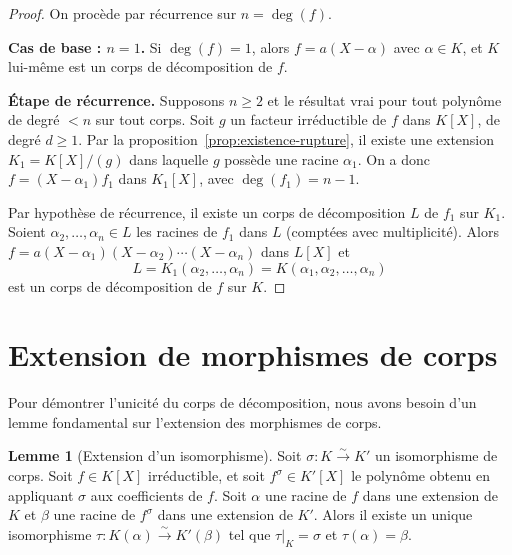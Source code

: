 \documentclass[12pt,a4paper,openany]{book}
\theoremstyle{definition}
\newtheorem{lemme}{Lemme}[chapter]
\renewcommand{\deg}{\operatorname{deg}}
\begin{document}
\begin{proof}
On procède par récurrence sur $n = \deg(f)$.

\textbf{Cas de base : $n = 1$.} Si $\deg(f) = 1$, alors $f = a(X - \alpha)$
avec $\alpha \in K$, et $K$ lui-même est un corps de décomposition de $f$.

\textbf{Étape de récurrence.} Supposons $n \geq 2$ et le résultat vrai pour
tout polynôme de degré $< n$ sur tout corps. Soit $g$ un facteur irréductible
de $f$ dans $K[X]$, de degré $d \geq 1$. Par la proposition~\ref{prop:existence-rupture},
il existe une extension $K_1 = K[X]/(g)$ dans laquelle $g$ possède une racine
$\alpha_1$. On a donc $f = (X - \alpha_1) f_1$ dans $K_1[X]$, avec
$\deg(f_1) = n - 1$.

Par hypothèse de récurrence, il existe un corps de décomposition $L$ de $f_1$
sur $K_1$. Soient $\alpha_2, \dots, \alpha_n \in L$ les racines de $f_1$ dans $L$
(comptées avec multiplicité). Alors
$f = a(X - \alpha_1)(X - \alpha_2)\cdots(X - \alpha_n)$ dans $L[X]$ et
\[
  L = K_1(\alpha_2, \dots, \alpha_n) = K(\alpha_1, \alpha_2, \dots, \alpha_n)
\]
est un corps de décomposition de $f$ sur $K$.
\end{proof}

\section{Extension de morphismes de corps}
\label{sec:extension-morphismes}

Pour démontrer l'unicité du corps de décomposition, nous avons besoin d'un lemme
fondamental sur l'extension des morphismes de corps.

\begin{lemme}[Extension d'un isomorphisme]\label{lem:extension-iso}
Soit $\sigma \colon K \xrightarrow{\sim} K'$ un isomorphisme de corps. Soit
$f \in K[X]$ irréductible, et soit $f^\sigma \in K'[X]$ le polynôme obtenu en
appliquant $\sigma$ aux coefficients de $f$. Soit $\alpha$ une racine de $f$
dans une extension de $K$ et $\beta$ une racine de $f^\sigma$ dans une extension
de $K'$. Alors il existe un unique isomorphisme
$\tau \colon K(\alpha) \xrightarrow{\sim} K'(\beta)$ tel que
$\tau|_K = \sigma$ et $\tau(\alpha) = \beta$.
\end{lemme}
\end{document}

